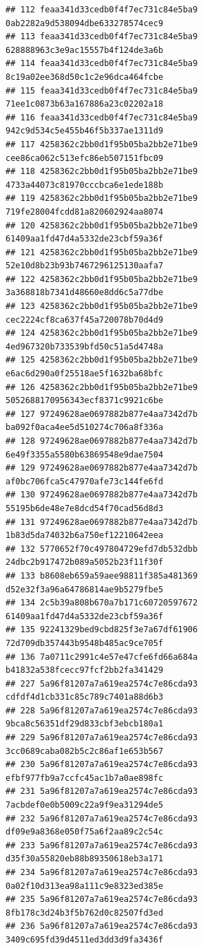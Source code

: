 \documentclass[]{article}
\begin{document}
\begin{verbatim}
## 112 feaa341d33cedb0f4f7ec731c84e5ba9   0ab2282a9d538094dbe633278574cec9
## 113 feaa341d33cedb0f4f7ec731c84e5ba9   628888963c3e9ac15557b4f124de3a6b
## 114 feaa341d33cedb0f4f7ec731c84e5ba9   8c19a02ee368d50c1c2e96dca464fcbe
## 115 feaa341d33cedb0f4f7ec731c84e5ba9   71ee1c0873b63a167886a23c02202a18
## 116 feaa341d33cedb0f4f7ec731c84e5ba9   942c9d534c5e455b46f5b337ae1311d9
## 117 4258362c2bb0d1f95b05ba2bb2e71be9   cee86ca062c513efc86eb507151fbc09
## 118 4258362c2bb0d1f95b05ba2bb2e71be9   4733a44073c81970cccbca6e1ede188b
## 119 4258362c2bb0d1f95b05ba2bb2e71be9   719fe28004fcdd81a820602924aa8074
## 120 4258362c2bb0d1f95b05ba2bb2e71be9   61409aa1fd47d4a5332de23cbf59a36f
## 121 4258362c2bb0d1f95b05ba2bb2e71be9   52e10d8b23b93b7467296125130aafa7
## 122 4258362c2bb0d1f95b05ba2bb2e71be9   3a368818b7341d48660e8dd6c5a77dbe
## 123 4258362c2bb0d1f95b05ba2bb2e71be9   cec2224cf8ca637f45a720078b70d4d9
## 124 4258362c2bb0d1f95b05ba2bb2e71be9   4ed967320b733539bfd50c51a5d4748a
## 125 4258362c2bb0d1f95b05ba2bb2e71be9   e6ac6d290a0f25518ae5f1632ba68bfc
## 126 4258362c2bb0d1f95b05ba2bb2e71be9   5052688170956343ecf8371c9921c6be
## 127 97249628ae0697882b877e4aa7342d7b   ba092f0aca4ee5d510274c706a8f336a
## 128 97249628ae0697882b877e4aa7342d7b   6e49f3355a5580b63869548e9dae7504
## 129 97249628ae0697882b877e4aa7342d7b   af0bc706fca5c47970afe73c144fe6fd
## 130 97249628ae0697882b877e4aa7342d7b   55195b6de48e7e8dcd54f70cad56d8d3
## 131 97249628ae0697882b877e4aa7342d7b   1b83d5da74032b6a750ef12210642eea
## 132 5770652f70c497804729efd7db532dbb   24dbc2b917472b089a5052b23f11f30f
## 133 b8608eb659a59aee98811f385a481369   d52e32f3a96a64786814ae9b5279fbe5
## 134 2c5b39a808b670a7b171c60720597672   61409aa1fd47d4a5332de23cbf59a36f
## 135 92241329bed9cbd825f3e7a67df61906   72d709db357443b9548b485ac9ce705f
## 136 7a0711c2991c4e57e47cfe6fd66a684a   b41832a538fcecc97fcf2bb2fa341429
## 227 5a96f81207a7a619ea2574c7e86cda93   cdfdf4d1cb331c85c789c7401a88d6b3
## 228 5a96f81207a7a619ea2574c7e86cda93   9bca8c56351df29d833cbf3ebcb180a1
## 229 5a96f81207a7a619ea2574c7e86cda93   3cc0689caba082b5c2c86af1e653b567
## 230 5a96f81207a7a619ea2574c7e86cda93   efbf977fb9a7ccfc45ac1b7a0ae898fc
## 231 5a96f81207a7a619ea2574c7e86cda93   7acbdef0e0b5009c22a9f9ea31294de5
## 232 5a96f81207a7a619ea2574c7e86cda93   df09e9a8368e050f75a6f2aa89c2c54c
## 233 5a96f81207a7a619ea2574c7e86cda93   d35f30a55820eb88b89350618eb3a171
## 234 5a96f81207a7a619ea2574c7e86cda93   0a02f10d313ea98a111c9e8323ed385e
## 235 5a96f81207a7a619ea2574c7e86cda93   8fb178c3d24b3f5b762d0c82507fd3ed
## 236 5a96f81207a7a619ea2574c7e86cda93   3409c695fd39d4511ed3dd3d9fa3436f

\end{verbatim}
\end{document}

